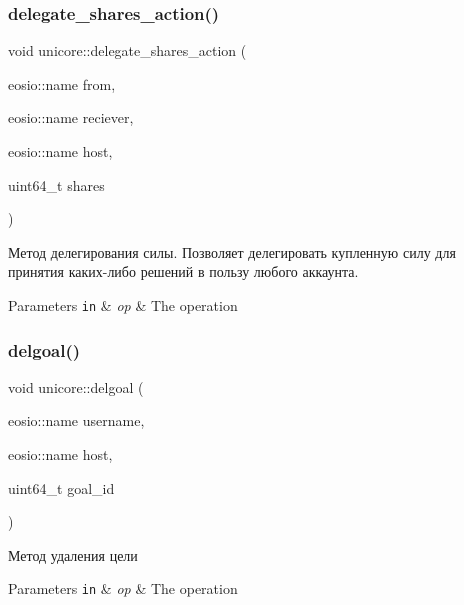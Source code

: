 \subsubsection{\texorpdfstring{delegate\+\_\+shares\+\_\+action()}{delegate\_shares\_action()}}
{\footnotesize\ttfamily void unicore\+::delegate\+\_\+shares\+\_\+action (\begin{DoxyParamCaption}\item[{eosio\+::name}]{from,  }\item[{eosio\+::name}]{reciever,  }\item[{eosio\+::name}]{host,  }\item[{uint64\+\_\+t}]{shares }\end{DoxyParamCaption})\hspace{0.3cm}{\ttfamily [static]}}



Метод делегирования силы. Позволяет делегировать купленную силу для принятия каких-\/либо решений в пользу любого аккаунта. 


\begin{DoxyParams}[1]{Parameters}
\mbox{\tt in}  & {\em op} & The operation \\
\hline
\end{DoxyParams}
\mbox{\label{classunicore_a9fd534e0b189439c6f18e99689911b3e}} 
\subsubsection{\texorpdfstring{delgoal()}{delgoal()}}
{\footnotesize\ttfamily void unicore\+::delgoal (\begin{DoxyParamCaption}\item[{eosio\+::name}]{username,  }\item[{eosio\+::name}]{host,  }\item[{uint64\+\_\+t}]{goal\+\_\+id }\end{DoxyParamCaption})}



Метод удаления цели 


\begin{DoxyParams}[1]{Parameters}
\mbox{\tt in}  & {\em op} & The operation \\
\hline
\end{DoxyParams}
\mbox{\label{classunicore_a09d7d2d602069a26875aa1eee250d5f4}} 
